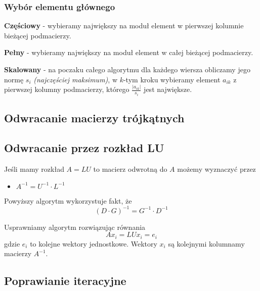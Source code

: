 \documentclass[../mn-notatki.tex]{subfiles}
\begin{document}
\subsubsection{Wybór elementu głównego}

\begin{tcolorbox}
\textbf{Częściowy} - wybieramy największy na moduł element w pierwszej kolumnie
bieżącej podmacierzy.
\end{tcolorbox}

\begin{tcolorbox}
\textbf{Pełny} - wybieramy największy na moduł element w całej
bieżącej podmacierzy.
\end{tcolorbox}

\begin{tcolorbox}
\textbf{Skalowany} - na poczaku całego algorytmu dla każdego wiersza obliczamy
jego normę $s_i$ \textit{(najczęściej maksimum)}, w $k$-tym kroku wybieramy
element $a_{ik}$ z pierwszej kolumny podmacierzy, którego
$\frac{|a_{ik}|}{s_i}$ jest największe.
\end{tcolorbox}

\subsection{Odwracanie macierzy trójkątnych}
\subsection{Odwracanie przez rozkład LU}

\begin{tcolorbox}
Jeśli mamy rozkład $A = LU$ to macierz odwrotną do $A$ możemy wyznaczyć przez
\begin{itemize}
    \item $A^{-1} = U^{-1} \cdot L^{-1}$
\end{itemize}
Powyższy algorytm wykorzystuje fakt, że
\[
(D\cdot G)^{-1} = G^{-1} \cdot D^{-1}
\]
\end{tcolorbox}

Usprawniamy algorytm rozwiązując równania
\[
Ax_i = LUx_i = e_i
\]
gdzie $e_i$ to kolejne wektory jednostkowe. Wektory $x_i$ są kolejnymi
kolumnamy macierzy $A^{-1}$.

\subsection{Poprawianie iteracyjne}
\end{document}
